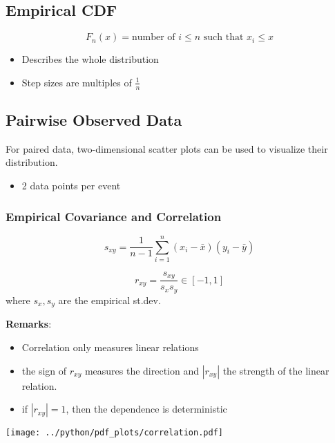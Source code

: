 \subsection{Empirical CDF}
\noindent\begin{equation*}
    F_n(x)= \text{number of } i\le n \text{ such that } x_i\le x
\end{equation*}

\begin{itemize}
    \item Describes the whole distribution
    \item Step sizes are multiples of $\frac{1}{n}$
\end{itemize}

\subsection{Pairwise Observed Data}
For paired data, two-dimensional scatter plots can be used to visualize their distribution.

\begin{itemize}
    \item 2 data points per event
\end{itemize}

\subsubsection{Empirical Covariance and Correlation}

\noindent\begin{equation*}
    s_{xy}=\frac{1}{n-1}\sum_{i=1}^n(x_i-\bar{x})(y_i-\bar{y})
\end{equation*}


\noindent\begin{equation*}
    r_{xy}=\frac{s_{xy}}{s_x s_y}\in[-1,1]
\end{equation*}
where $s_x,s_y$ are the empirical st.dev.\

\textbf{Remarks}:
\begin{itemize}
    \item Correlation only measures linear relations
    \item the sign of $r_{xy}$ measures the direction and $|r_{xy}|$ the strength of the linear relation.
    \item if $|r_{xy}|=1$, then the dependence is deterministic
\end{itemize}
\begin{center}
    \texttt{[image: ../python/pdf\_plots/correlation.pdf]}
\end{center}